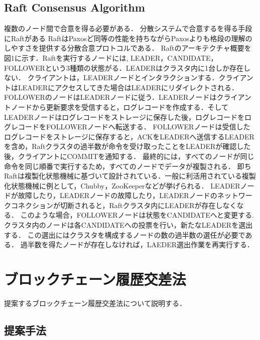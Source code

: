 \documentclass[a4paper,12pt]{jsarticle}
\begin{document}
\subsection{Raft Consensus Algorithm}\cite{Raft Consensus Algorithm}
\label{Raft}
複数のノード間で合意を得る必要がある．
分散システムで合意するを得る手段にRaftがある
RaftはPaxosど同等の性能を持ちながらPaxosよりも格段の理解のしやすさを提供する分散合意プロトコルである．
Raftのアーキテクチャ概要を図1に示す．Raftを実行するノードには, LEADER，CANDIDATE，FOLLOWERという$3$種類の状態がる．LEADERはクラスタ内に1台しか存在しない．
クライアントは，LEADERノードとインタラクションする．クライアントはLEADERにアクセスしてきた場合はLEADERにリダイレクトされる．
FOLLOWERのノードはLEADERノードに従う．LEADERノードはクライアントノードから更新要求を受信すると，ログレコードを作成する．そしてLEADERノードはログレコードをストレージに保存した後，ログレコードをログレコードをFOLLOWERノードへ転送する．
FOLLOWERノードは受信したログレコードをストレージに保存すると，ACKをLEADERへ送信するLEADERを含め，Raftクラスタの過半数が命令を受け取ったことをLEADERが確認した後，クライアントにCOMMITを通知する．
最終的には，すべてのノードが同じ命令を同じ順番で実行するため，すべてのノードでデータが複製される．
即ちRaftは複製化状態機械に基づいて設計されている．一般に利活用されている複製化状態機械に例として，Chubby，ZooKeeperなどが挙げられる．
LEADERノードが故障したり，LEADERノードの故障したり，LEADERノードのネットワークコネクションが切断されると，Raftクラスタ内にLEADERが存在しなくなる．
このような場合，FOLLOWERノードは状態をCANDIDATEへと変更する.
クラスタ内のノードは各CANDIDATEへの投票を行い，新たなLEADERを選出する．
この選出にはクラスタを構成するノードの数の過半数の選任が必要である．
過半数を得たノードが存在しなければ，LAEDER選出作業を再実行する．

\newpage
\section{ブロックチェーン履歴交差法}
提案するブロックチェーン履歴交差法について説明する．
  \subsection{提案手法}
\label{teian}
\end{document}
